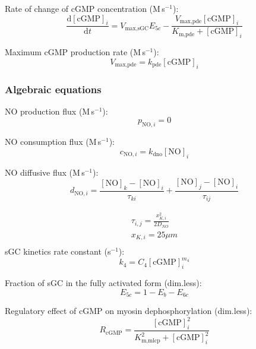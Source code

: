 \documentclass[fleqn]{report}
\numberwithin{equation}{section}
\numberwithin{equation}{section}
\newcommand{\NO}{\text{NO}}
\newcommand{\cGMP}{\text{cGMP}}
\newcommand{\uMpers}{\textmu M\,s$^{-1}$}
\newcommand{\n}{$^{-1}$}
\newcommand\pNO[1]{\text{$p_{\text{NO},#1}$}}
\newcommand\cNO[1]{\text{$c_{\text{NO},#1}$}}
\newcommand\dNO[1]{\text{$d_{\text{NO},#1}$}}
\begin{document}
					Rate of change of cGMP concentration (\uMpers):		%
					\begin{equation} 
						\dfrac{\mathrm{d}[\cGMP]_i}{\mathrm{d}t} = V_{\text{max,sGC}} E_{5c} - \frac{V_{\text{max,pde}}[\cGMP]_i}{K_{\text{m,pde}}+[\cGMP]_i}
					\end{equation}	
					
					
						Maximum cGMP production rate (\uMpers):
									\begin{equation}
										V_{\text{max,pde}} = k_{\text{pde}} [\text{cGMP}]_i
									\end{equation}
		       		
				\subsubsection*{Algebraic equations}
					NO production flux (\uMpers):
					\begin{equation} 
						\pNO{i} = 0
					\end{equation}
				
					NO consumption flux (\uMpers):
					\begin{equation} 
						\cNO{i} = k_{\text{dno}} [\NO]_i
					\end{equation}
		
					NO diffusive flux (\uMpers):
					\begin{equation} 
						\dNO{i} = \frac{[\NO]_k - [\NO]_i}{\tau_{ki}} + \frac{[\NO]_j - [\NO]_i}{\tau_{ij}}
					\end{equation}
		
						\begin{eqnarray} 
							\tau_{i,j}=\frac{x_{K,i}^2}{2 D_{NO}}\\
							x_{K,i}=25 \mu m \\
						\end{eqnarray}
					sGC kinetics rate constant (s\n): %
					\begin{equation} 
						k_4 = C_4 [\cGMP]_i^{m_{4}}
					\end{equation}	
					
					Fraction of sGC in the fully activated form (dim.less):%
					\begin{equation} 
						E_{5c} = 1 - E_b - E_{6c}
					\end{equation}	
					
					Regulatory effect of cGMP on myosin dephosphorylation (dim.less):			%
					\begin{equation} 
						R_{\text{cGMP}} = \frac{[\text{cGMP}]_i^2}{K_{\text{m,mlcp}}^2 + [\text{cGMP}]_i^2}
					\end{equation}
					
\end{document}
